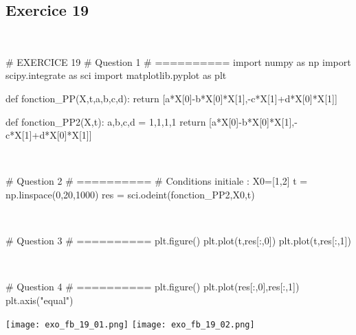 \documentclass[10pt,fleqn]{article} %
\begin{document}
\subsection*{Exercice 19}

\begin{corrige}
$\quad$
\begin{python}
# EXERCICE 19
# Question 1 
# ==========
import numpy as np
import scipy.integrate as sci
import matplotlib.pyplot as plt

def fonction_PP(X,t,a,b,c,d):
    return [a*X[0]-b*X[0]*X[1],-c*X[1]+d*X[0]*X[1]]

def fonction_PP2(X,t):
    a,b,c,d = 1,1,1,1
    return [a*X[0]-b*X[0]*X[1],-c*X[1]+d*X[0]*X[1]]
\end{python}
\end{corrige}


\begin{corrige}
$\quad$
\begin{python}
# Question 2 
# ==========
# Conditions initiale : 
X0=[1,2]
t = np.linspace(0,20,1000)
res = sci.odeint(fonction_PP2,X0,t)
\end{python}
\end{corrige}

\begin{corrige}
$\quad$
\begin{python}
# Question 3 
# ==========
plt.figure()
plt.plot(t,res[:,0])
plt.plot(t,res[:,1])
\end{python}
\end{corrige}

\begin{corrige}
$\quad$
\begin{python}
# Question 4 
# ==========
plt.figure()
plt.plot(res[:,0],res[:,1])
plt.axis("equal")
\end{python}
\end{corrige}



\begin{center}
\texttt{[image: exo\_fb\_19\_01.png]}
\texttt{[image: exo\_fb\_19\_02.png]}
\end{center}

%
\end{document}
